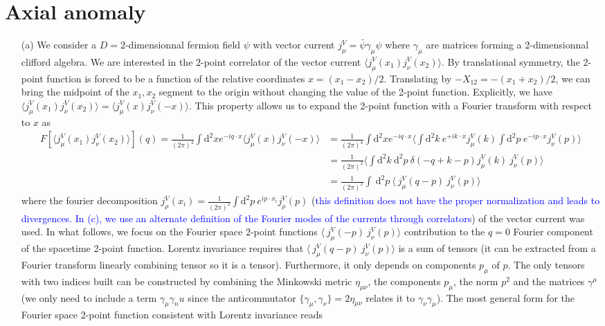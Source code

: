 \documentclass[10pt, a4paper]{article}
\begin{document}
{\begin{enumerate}
\end{enumerate}


\newpage
\section{Axial anomaly}

\begin{enumerate}
  \item[(a)] We consider a $D=2$-dimensionnal fermion field $\psi$ with vector current $j_{\mu}^V = \bar{\psi} \gamma_{\mu} \psi$ where $\gamma_\mu$ are matrices forming a 2-dimensionnal clifford algebra. We are interested in the 2-point correlator of the vector current $\langle j_{\mu}^{V}(x_1) j_{\nu}^{V}(x_2) \rangle$. By translational symmetry, the 2-point function is forced to be a function of the relative coordinates $x = (x_1-x_2)/2$. Translating by $-X_{12} = -(x_1 + x_2)/2$, we can bring the midpoint of the $x_1, x_2$ segment to the origin without changing the value of the 2-point function. Explicitly, we have $\langle j_{\mu}^{V}(x_1) j_{\nu}^{V}(x_2) \rangle = \langle j_{\mu}^{V}(x) j_{\nu}^{V}(-x) \rangle$. This property allows us to expand the 2-point function with a Fourier transform with respect to $x$ as 
  \begin{align*}
    F[\langle j_{\mu}^{V}(x_1) j_{\nu}^{V}(x_2) \rangle](q)  = \frac{1}{(2\pi)^4}\int \text{d}^2x e^{-i q \cdot  x} \langle j_{\mu}^{V}(x) j_{\nu}^{V}(-x) \rangle &= \frac{1}{(2\pi)^4}\int \text{d}^2x e^{-i q \cdot  x} \langle  \int \text{d}^2 k\  e^{+i k \cdot x} j_{\mu}^{V}(k) \int \text{d}^2 p\  e^{-i p \cdot x} j_{\nu}^{V}(p) \rangle\\
    &=  \frac{1}{(2\pi)^2} \langle  \int \text{d}^2 k\ \text{d}^2 p\ \delta(-q + k - p)  j_{\mu}^{V}(k) \  j_{\nu}^{V}(p) \rangle\\
    &= \frac{1}{(2\pi)^2}\int \ \text{d}^2 p \ \langle \ j_{\mu}^{V}(q-p) \ j_{\nu}^{V}(p) \rangle
  \end{align*}
  where the fourier decomposition $j_{\rho}^{V}(x_i) = \frac{1}{(2\pi)^2} \int \text{d}^2 p\ e^{i p \cdot x_i} j_{\rho}^{V}(p)$ (\textcolor{blue}{this definition does not have the proper normalization and leads to divergences. In (c), we use an alternate definition of the Fourier modes of the currents through correlators}) of the vector current was used. In what follows, we focus on the Fourier space 2-point functions $\langle \ j_{\mu}^{V}(-p) \ j_{\nu}^{V}(p) \rangle$ contribution to the $q = 0$ Fourier component of the spacetime 2-point function. Lorentz invariance requires that $\langle \ j_{\mu}^{V}(q-p) \ j_{\nu}^{V}(p) \rangle$ is a sum of tensors (it can be extracted from a Fourier transform linearly combining tensor so it is a tensor). Furthermore, it only depends on components $p_\mu$ of $p$. The only tensors with two indices built can be constructed by combining the Minkowski metric $\eta_{\mu\nu}$, the components  $p_\mu$, the norm $p^2$ and the matrices $\gamma^\mu$ (we only need to include a term $\gamma_\mu \gamma_nu$ since the anticommutator $\{\gamma_\mu, \gamma_\nu\} = 2 \eta_{\mu \nu}$ relates it to $\gamma_\nu \gamma_\mu$). The most general form for the Fourier space 2-point function consistent with Lorentz invariance reads 

\end{enumerate}}
\end{document}
